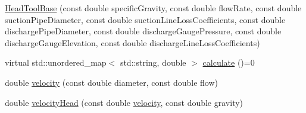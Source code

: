 \begin{DoxyCompactItemize}
\item 
\hyperlink{class_head_tool_base_ae5bb2325e1266c64b16937d964aea14f}{Head\+Tool\+Base} (const double specific\+Gravity, const double flow\+Rate, const double suction\+Pipe\+Diameter, const double suction\+Line\+Loss\+Coefficients, const double discharge\+Pipe\+Diameter, const double discharge\+Gauge\+Pressure, const double discharge\+Gauge\+Elevation, const double discharge\+Line\+Loss\+Coefficients)
\item 
virtual std\+::unordered\+\_\+map$<$ std\+::string, double $>$ \hyperlink{class_head_tool_base_ab8df8f908827ce45dc5e769ea0e10f0b}{calculate} ()=0
\item 
double \hyperlink{class_head_tool_base_ab79bb695c514b740d9ea01df60b68a23}{velocity} (const double diameter, const double flow)
\item 
double \hyperlink{class_head_tool_base_a1dbece05fc1a248fa2aa64b6f09602f6}{velocity\+Head} (const double \hyperlink{class_head_tool_base_ab79bb695c514b740d9ea01df60b68a23}{velocity}, const double gravity)
\end{DoxyCompactItemize}
